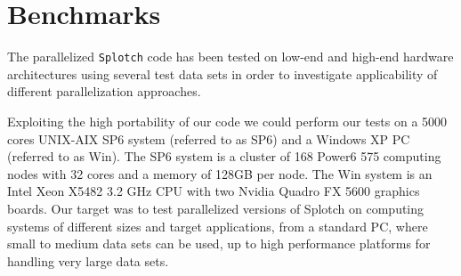 \documentclass[1p,times]{elsarticle}
\begin{document}



\section{Benchmarks}

The parallelized {\tt Splotch} code has been tested on low-end and high-end hardware 
architectures using several test data sets in order to investigate applicability of
different parallelization approaches.

Exploiting the high portability of our code we could perform our tests on a 
5000 cores UNIX-AIX  SP6 system (referred to as SP6) and a Windows XP PC (referred to as Win). 
The SP6 system is a cluster of 168 Power6 575 computing nodes with 32 cores
and a memory of 128GB per node. The Win system is an Intel Xeon X5482 3.2 GHz CPU with 
two Nvidia Quadro FX 5600 graphics boards. Our target was to test parallelized
versions of Splotch on computing systems of different sizes and target applications, 
from a standard PC, where small to medium data sets can be used, up to high
performance platforms for handling very large data sets.
\end{document}
